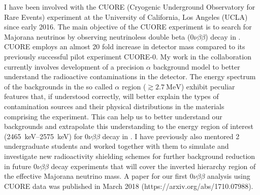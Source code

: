 \documentclass[10pt]{article} %
\begin{document}
I have been involved with the CUORE (Cryogenic Underground Observatory for Rare
Events) experiment at the University of California, Los Angeles (UCLA) since
early 2016. The main objective of the CUORE experiment is to search for
Majorana neutrinos by observing neutrinoless double beta ($0\nu\beta\beta$)
decay in . CUORE employs an almost 20 fold increase in detector
mass compared to its previously successful pilot experiment CUORE-0. My work in
the collaboration currently involves development of a precision $\alpha$
background model to better understand the radioactive contaminations in the
detector. The energy spectrum of the backgrounds in the so called $\alpha$
region ($\gtrsim \SI{2.7}{\mega\electronvolt}$) exhibit peculiar features that,
if understood correctly, will better explain the types of contamination sources
and their physical distributions in the materials comprising the experiment.
This can help us to better understand our backgrounds and extrapolate this
understanding to the energy region of interest
(\SIrange{2465}{2575}{\kilo\electronvolt}) for $0\nu\beta\beta$ decay in
. I have previously also mentored 2 undergraduate students and
worked together with them to simulate and investigate new radioactivity
shielding schemes for further background reduction in future $0\nu\beta\beta$
decay experiments that will cover the inverted hierarchy region of the
effective Majorana neutrino mass. A paper for our first $0\nu\beta\beta$
analysis using CUORE data was published in March 2018
(https://arxiv.org/abs/1710.07988).


\end{document}
